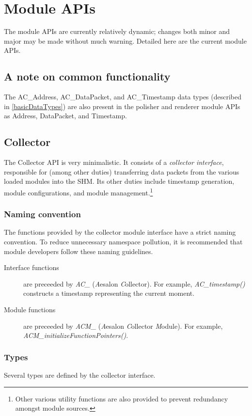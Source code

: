 
\chapter{Module APIs}
The module APIs are currently relatively dynamic; changes both minor and major may be made without much warning.
Detailed here are the current module APIs.

\section{A note on common functionality}
The AC\_Address, AC\_DataPacket, and AC\_Timestamp data types (described in \ref{basicDataTypes}) are also present in
the polisher and renderer module APIs as Address, DataPacket, and Timestamp.

\section{Collector}
The Collector API is very minimalistic. It consists of a \emph{collector interface}, responsible for (among other
duties)
transferring data packets from the various loaded modules into the SHM. Its other duties include timestamp generation,
module configurations, and module management.\footnote{Other various utility functions are also provided to prevent
redundancy amongst module sources.}

\subsection{Naming convention}
The functions provided by the collector module interface have a strict naming convention. To reduce unnecessary
namespace
pollution, it is recommended that module developers follow these naming guidelines.
\begin{description}
 \item[Interface functions] are preceeded by \emph{AC\_} (\emph{A}esalon \emph{C}ollector). For example,
\emph{AC\_timestamp()}
constructs a timestamp representing the current moment.
 \item[Module functions] are preceeded by \emph{ACM\_} (\emph{A}esalon \emph{C}ollector \emph{M}odule). For example,
\emph{ACM\_initializeFunctionPointers()}.
\end{description}

\subsection{Types}
Several types are defined by the collector interface.

